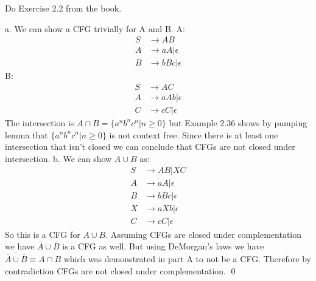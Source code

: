 \begin{problem}{6}
  Do Exercise 2.2 from the book.
  \begin{solution}
    a. We can show a CFG trivially for A and B.
    \br
    A:
    \begin{align*}
      S &\rightarrow AB \\
      A &\rightarrow aA|\epsilon \\
      B &\rightarrow bBc|\epsilon
    \end{align*}
    B:
    \begin{align*}
      S &\rightarrow AC \\
      A &\rightarrow aAb|\epsilon \\
      C &\rightarrow cC|\epsilon
    \end{align*}
    The intersection is $A \cap B = \{ a^nb^nc^n|n \ge 0 \}$ but Example 2.36 shows by pumping lemma that $\{
    a^nb^nc^n|n \ge 0 \}$ is not context free. Since there is at least one intersection that isn't closed we can
    conclude that CFGs are not closed under intersection.
    \br
    b. We can show $A \cup B$ as:
    \begin{align*}
      S &\rightarrow AB|XC \\
      A &\rightarrow aA|\epsilon \\
      B &\rightarrow bBc|\epsilon \\
      X &\rightarrow aXb|\epsilon \\
      C &\rightarrow cC|\epsilon
    \end{align*}
    So this is a CFG for $A \cup B$. Assuming CFGs are closed under complementation we have $\overline{A} \cup \overline{B}$ is a CFG as well. But using DeMorgan's laws we have $\overline{\overline{A} \cup \overline{B}} \equiv A \cap B$ which was demonstrated in part A to not be a CFG. Therefore by contradiction CFGs are not closed under complementation. \qed
  \end{solution}
\end{problem}

